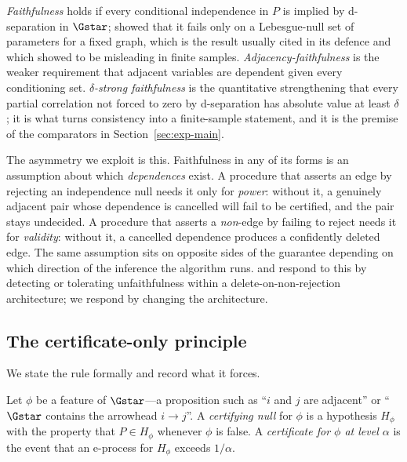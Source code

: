 \emph{Faithfulness} holds if every conditional independence in $P$ is implied
by d-separation in $\Gstar$; \citet{meek1995strong} showed that it fails only
on a Lebesgue-null set of parameters for a fixed graph, which is the result
usually cited in its defence and which \citet{uhler2013geometry} showed to be
misleading in finite samples. \emph{Adjacency-faithfulness}
\citep{ramsey2006adjacency} is the weaker requirement that adjacent variables
are dependent given every conditioning set. \emph{$\delta$-strong
faithfulness} \citep{uhler2013geometry,kalisch2007estimating} is the
quantitative strengthening that every partial correlation not forced to zero
by d-separation has absolute value at least $\delta$; it is what turns
consistency into a finite-sample statement, and it is the premise of the
comparators in Section~\ref{sec:exp-main}.

The asymmetry we exploit is this. Faithfulness in any of its forms is an
assumption about which \emph{dependences} exist. A procedure that asserts an
edge by rejecting an independence null needs it only for \emph{power}: without
it, a genuinely adjacent pair whose dependence is cancelled will fail to be
certified, and the pair stays undecided. A procedure that asserts a
\emph{non}-edge by failing to reject needs it for \emph{validity}: without it,
a cancelled dependence produces a confidently deleted edge. The same
assumption sits on opposite sides of the guarantee depending on which
direction of the inference the algorithm runs. \citet{zhang2008detection} and
\citet{ramsey2006adjacency} respond to this by detecting or tolerating
unfaithfulness within a delete-on-non-rejection architecture; we respond by
changing the architecture.

\subsection{The certificate-only principle}\label{sec:principle}

We state the rule formally and record what it forces.

\begin{definition}[Certificate]\label{def:cert}
Let $\phi$ be a feature of $\Gstar$---a proposition such as ``$i$ and $j$ are
adjacent'' or ``$\Gstar$ contains the arrowhead $i \to j$''. A
\emph{certifying null} for $\phi$ is a hypothesis $H_\phi$ with the property
that $P \in H_\phi$ whenever $\phi$ is false. A \emph{certificate for $\phi$
at level $\alpha$} is the event that an e-process for $H_\phi$ exceeds
$1/\alpha$.
\end{definition}

